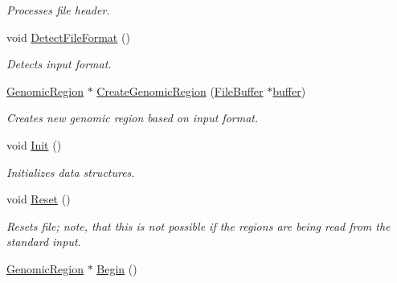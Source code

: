 \begin{CompactItemize}
\begin{CompactList}\small\item\em Processes file header. \item\end{CompactList}\item 
\hypertarget{classGenomicRegionSet_5721a1d9ca4ca18ddbcad1e563d42019}{
void \hyperlink{classGenomicRegionSet_5721a1d9ca4ca18ddbcad1e563d42019}{DetectFileFormat} ()}
\label{classGenomicRegionSet_5721a1d9ca4ca18ddbcad1e563d42019}

\begin{CompactList}\small\item\em Detects input format. \item\end{CompactList}\item 
\hypertarget{classGenomicRegionSet_4e8e101aebcedd6a5892d463fe830450}{
\hyperlink{classGenomicRegion}{GenomicRegion} $\ast$ \hyperlink{classGenomicRegionSet_4e8e101aebcedd6a5892d463fe830450}{CreateGenomicRegion} (\hyperlink{classFileBuffer}{FileBuffer} $\ast$\hyperlink{classGenomicRegionSet_df3a5598e31ddbb5b381125925362085}{buffer})}
\label{classGenomicRegionSet_4e8e101aebcedd6a5892d463fe830450}

\begin{CompactList}\small\item\em Creates new genomic region based on input format. \item\end{CompactList}\item 
\hypertarget{classGenomicRegionSet_94b1955e7a4127efaceba25429af7568}{
void \hyperlink{classGenomicRegionSet_94b1955e7a4127efaceba25429af7568}{Init} ()}
\label{classGenomicRegionSet_94b1955e7a4127efaceba25429af7568}

\begin{CompactList}\small\item\em Initializes data structures. \item\end{CompactList}\item 
\hypertarget{classGenomicRegionSet_ae7295913424148013df6a154c5458aa}{
void \hyperlink{classGenomicRegionSet_ae7295913424148013df6a154c5458aa}{Reset} ()}
\label{classGenomicRegionSet_ae7295913424148013df6a154c5458aa}

\begin{CompactList}\small\item\em Resets file; note, that this is not possible if the regions are being read from the standard input. \item\end{CompactList}\item 
\hypertarget{classGenomicRegionSet_06e2e8f91623c01e6e00500888b9ba3d}{
\hyperlink{classGenomicRegion}{GenomicRegion} $\ast$ \hyperlink{classGenomicRegionSet_06e2e8f91623c01e6e00500888b9ba3d}{Begin} ()}
\label{classGenomicRegionSet_06e2e8f91623c01e6e00500888b9ba3d}


\end{CompactItemize}
